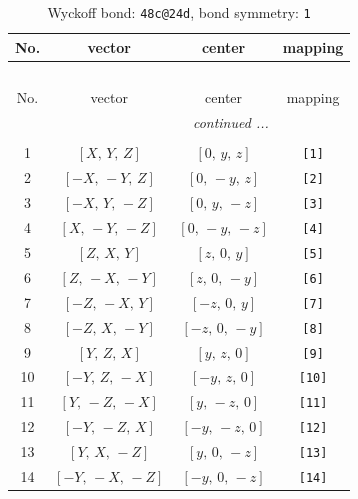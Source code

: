 \documentclass[fleqn,8pt]{jsarticle}
\begin{document}
\begin{longtable}{cccc}
\caption{Wyckoff bond: {\tt 48c@24d}, bond symmetry: {\tt 1}}
 \\
 \hline \hline
No. & vector & center & mapping \\ \hline \endfirsthead

\multicolumn{3}{l}{\tablename\ \thetable{}} \\
 \hline \hline
No. & vector & center & mapping \\ \hline \endhead

 \hline \hline
\multicolumn{3}{r}{\footnotesize\it continued ...} \\ \endfoot

 \hline \hline
\multicolumn{3}{r}{} \\ \endlastfoot

1 & $\left[ X,\, Y,\, Z \right]$ & $\left[ 0,\, y,\, z \right]$ & {\tt [1]} \\ \hline
2 & $\left[ - X,\, - Y,\, Z \right]$ & $\left[ 0,\, - y,\, z \right]$ & {\tt [2]} \\ \hline
3 & $\left[ - X,\, Y,\, - Z \right]$ & $\left[ 0,\, y,\, - z \right]$ & {\tt [3]} \\ \hline
4 & $\left[ X,\, - Y,\, - Z \right]$ & $\left[ 0,\, - y,\, - z \right]$ & {\tt [4]} \\ \hline
5 & $\left[ Z,\, X,\, Y \right]$ & $\left[ z,\, 0,\, y \right]$ & {\tt [5]} \\ \hline
6 & $\left[ Z,\, - X,\, - Y \right]$ & $\left[ z,\, 0,\, - y \right]$ & {\tt [6]} \\ \hline
7 & $\left[ - Z,\, - X,\, Y \right]$ & $\left[ - z,\, 0,\, y \right]$ & {\tt [7]} \\ \hline
8 & $\left[ - Z,\, X,\, - Y \right]$ & $\left[ - z,\, 0,\, - y \right]$ & {\tt [8]} \\ \hline
9 & $\left[ Y,\, Z,\, X \right]$ & $\left[ y,\, z,\, 0 \right]$ & {\tt [9]} \\ \hline
10 & $\left[ - Y,\, Z,\, - X \right]$ & $\left[ - y,\, z,\, 0 \right]$ & {\tt [10]} \\ \hline
11 & $\left[ Y,\, - Z,\, - X \right]$ & $\left[ y,\, - z,\, 0 \right]$ & {\tt [11]} \\ \hline
12 & $\left[ - Y,\, - Z,\, X \right]$ & $\left[ - y,\, - z,\, 0 \right]$ & {\tt [12]} \\ \hline
13 & $\left[ Y,\, X,\, - Z \right]$ & $\left[ y,\, 0,\, - z \right]$ & {\tt [13]} \\ \hline
14 & $\left[ - Y,\, - X,\, - Z \right]$ & $\left[ - y,\, 0,\, - z \right]$ & {\tt [14]} \\ \hline

\end{longtable}
\end{document}
